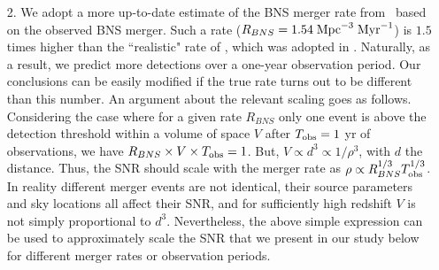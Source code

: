 \documentclass[prd,aps,floatfix,superscriptaddress,nofootinbib,twocolumn,10pt,English]{revtex4-1}
\begin{document}
\begin{itemize}
%
where $\varsigma$ is the inclination angle of the BNS orbit with
respect to the line of sight. The
overall amplitude reduction factor with respect to the optimal
configuration that enters in Eq.~\eqref{eq:w22} is then given by
$A_r=\sqrt{\mathcal A^2_++\mathcal A^2_\times}$ for an ``L"-shape
detector and $A_r=(2/\sqrt{3}) \sqrt{\mathcal A^2_++\mathcal
  A^2_\times}$ for a single detector following the ET design. If we
allow three detectors placed in a triangle geometry as explained in
\cite{regimbau2012mock}, the corresponding factor is
$A_r=2/\sqrt{3}\sqrt{\sum_{i,j} \mathcal A^2_i
  (\theta,\phi+2\pi j/3,\psi,\varsigma)}$ 
  with the summation over 
  $i=(+,\times)$ and $j=(-1,0,1)$. The total SNR receives a
factor of $\sqrt{3}$ boost on average compared to the single detector case. 
In fact, if there are $N_d$
identical detectors, the total SNR is a factor of $\sqrt{N_d}$ larger
than the single detector SNR.


\item[2.] We adopt a more up-to-date estimate of the BNS merger rate
  from~\cite{TheLIGOScientific:2017qsa} based on the observed BNS merger. Such a rate ($R_{BNS} =
  1.54 \; {\rm Mpc}^{-3} \; {\rm Myr}^{-1}$) is
  $1.5$ times higher than
  the ``realistic" rate of \cite{abadie2010predictions}, which was
  adopted in \cite{clark2016observing}. Naturally, as a result, we
  predict more detections over a one-year observation period. Our
  conclusions can be easily modified if the true rate turns out to be
  different than this number. An argument about the relevant scaling
  goes as follows. Considering the case where for a given rate
  $R_{BNS}$ only one event is above the detection threshold within a
  volume of space $V$ after $T_{\rm obs}= 1$ yr of observations, we
  have $R_{BNS}\times V\times T_{\rm obs}=1$. But, $V \propto d^3
  \propto 1/\rho^3$, with $d$ the distance. Thus, the SNR should scale
  with the merger rate as $\rho \propto R_{BNS}^{1/3}T_{\rm
    obs}^{1/3}$. In reality different merger events are not identical,
  their source parameters and sky locations all affect their SNR, and
  for sufficiently high redshift $V$ is not simply proportional to
  $d^3$. Nevertheless, the above simple expression can be used to
  approximately scale the SNR that we present in our study below for
  different merger rates or observation periods.
  
 

\end{itemize}
\end{document}
